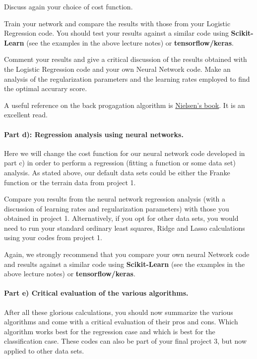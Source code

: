\documentclass[%
oneside,                 %
final,                   %
10pt]{article}
\begin{document}
Discuss again your choice of cost function.

Train your network and compare the results with those from your Logistic  Regression code. 
You should test your results against a similar code using \textbf{Scikit-Learn} (see the examples in the above lecture notes) or \textbf{tensorflow/keras}. 

Comment your results and give a critical discussion of the results
obtained with the Logistic Regression code and your own Neural Network
code.  Make an analysis of the regularization parameters and the learning rates employed to find the optimal accurary score.

A useful reference on the back progagation algorithm is \href{{http://neuralnetworksanddeeplearning.com/}}{Nielsen's
book}. It is an excellent
read.


\paragraph{Part d): Regression analysis using neural networks.}
Here we will change the cost function for our neural network code
developed in part c) in order to perform a regression (fitting a
function or some data set) analysis. As stated above, our default data
sets could be either the Franke function or the terrain data from
project 1.

Compare you results from the neural network regression analysis (with a discussion of learning rates and regularization parameters)
with those you obtained in project 1. Alternatively, if you opt for other data sets, you would need to run your standard ordinary least squares, Ridge and Lasso calculations using your codes from project 1.

Again, we strongly recommend that you compare your own neural Network code and results against a similar code using \textbf{Scikit-Learn} (see the examples in the above lecture notes) or \textbf{tensorflow/keras}. 



\paragraph{Part e) Critical evaluation of the various algorithms.}
After all these glorious calculations, you should now summarize the
various algorithms and come with a critical evaluation of their pros
and cons. Which algorithm works best for the regression case and which
is best for the classification case. These codes can also be part of
your final project 3, but now applied to other data sets.
\end{document}
